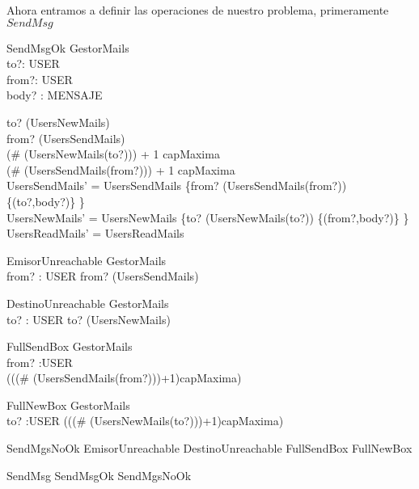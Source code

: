 Ahora entramos a definir las operaciones de nuestro problema, primeramente $SendMsg$

{\small
\begin{schema}{SendMsgOk}
\Delta GestorMails \\
to?: USER \\
from?: USER \\
body? : MENSAJE
\where

to? \in \dom(UsersNewMails) \\
from? \in \dom(UsersSendMails) \\

(\# (UsersNewMails(to?))) + 1 \leq capMaxima \\
(\# (UsersSendMails(from?))) + 1 \leq capMaxima \\

UsersSendMails' = UsersSendMails \oplus \{from? \mapsto (UsersSendMails(from?)) \cup \{(to?,body?)\} \} \\ 
UsersNewMails' = UsersNewMails \oplus \{to? \mapsto (UsersNewMails(to?)) \cup \{(from?,body?)\} \} \\
UsersReadMails' = UsersReadMails

\end{schema}
}
\begin{schema}{EmisorUnreachable}
\Xi GestorMails \\
from? : USER
\where
from? \notin \dom(UsersSendMails)
\end{schema}

\begin{schema}{DestinoUnreachable}
\Xi GestorMails \\
to? : USER
\where
to? \notin \dom(UsersNewMails)
\end{schema}

\begin{schema}{FullSendBox}
\Xi GestorMails \\
from? :USER \\
\where
\lnot(((\# (UsersSendMails(from?)))+1)\leq capMaxima)
\end{schema}

\begin{schema}{FullNewBox}
\Xi GestorMails \\
to? :USER 
\where
\lnot(((\# (UsersNewMails(to?)))+1)\leq capMaxima)
\end{schema}

{\small
\begin{zed}
SendMgsNoOk  EmisorUnreachable \lor DestinoUnreachable \lor FullSendBox \lor FullNewBox \\
\end{zed}
}
\begin{zed}
SendMsg  SendMsgOk \lor SendMgsNoOk \\
\end{zed}

